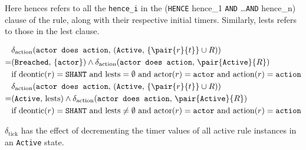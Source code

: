 \documentclass{article}
\begin{document}
Here hences refers to all the \texttt{hence\_i} in the
(\texttt{HENCE} hence\_1 \texttt{AND} \dots \texttt{AND} hence\_n)
clause of the rule, along with their respective initial timers.
Similarly, lests refers to those in the lest clause.

\begin{align*}
  & \delta_\text{action}(
    \texttt{actor does action}, \,
    (
      \texttt{Active}, \,
      \{\pair{r}{t}\} \cup R
    )
  )
  \\
  = &
  (
    \texttt{Breached}, \,
    \{\texttt{actor}\}
  )
  \wedge
  \delta_\text{action}(\texttt{actor does action}, \, \pair{\texttt{Active}}{R})
  \\
  & \text{if deontic}(r) = \texttt{SHANT} \text{ and lests} = \emptyset
  \text{ and } \text{actor}(r) = \texttt{actor}
  \text{ and } \text{action}(r) = \texttt{action}
  \\
  & \delta_\text{action}(
    \texttt{actor does action}, \,
    (
      \texttt{Active}, \,
      \{\pair{r}{t}\} \cup R
    )
  )
  \\
  = &
  (
    \texttt{Active}, \,
    \text{lests}
  )
  \wedge
  \delta_\text{action}(\texttt{actor does action}, \, \pair{\texttt{Active}}{R})
  \\
  & \text{if deontic}(r) = \texttt{SHANT} \text{ and lests} \neq \emptyset
  \text{ and } \text{actor}(r) = \texttt{actor}
  \text{ and } \text{action}(r) = \texttt{action}
\end{align*}


$\delta_\text{tick}$ has the effect of decrementing the timer values of all
active rule instances in an \texttt{Active} state.


\end{document}
